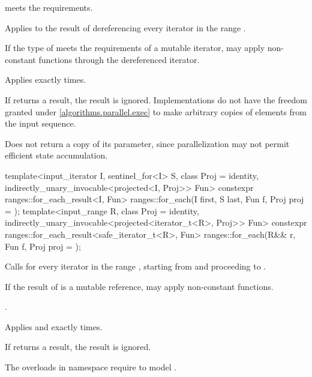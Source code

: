 \begin{itemdescr}
\pnum
\expects
{} meets the  requirements.

\pnum
\effects
Applies  to the result of dereferencing
every iterator in the range .
\begin{note}
If the type of  meets the requirements of a mutable iterator,
 may apply non-constant functions through the dereferenced iterator.
\end{note}

\pnum
\complexity
Applies  exactly  times.

\pnum
\remarks
If  returns a result, the result is ignored.
Implementations do not have
the freedom granted under \ref{algorithms.parallel.exec}
to make arbitrary copies of elements from the input sequence.

\pnum
\begin{note}
Does not return a copy of its  parameter,
since parallelization may not permit efficient state accumulation.
\end{note}
\end{itemdescr}

%
\begin{itemdecl}
template<input_iterator I, sentinel_for<I> S, class Proj = identity,
         indirectly_unary_invocable<projected<I, Proj>> Fun>
  constexpr ranges::for_each_result<I, Fun>
    ranges::for_each(I first, S last, Fun f, Proj proj = {});
template<input_range R, class Proj = identity,
         indirectly_unary_invocable<projected<iterator_t<R>, Proj>> Fun>
  constexpr ranges::for_each_result<safe_iterator_t<R>, Fun>
    ranges::for_each(R&& r, Fun f, Proj proj = {});
\end{itemdecl}

\begin{itemdescr}
\pnum
\effects
Calls 
for every iterator  in the range ,
starting from  and proceeding to .
\begin{note}
If the result of  is a mutable reference,
 may apply non-constant functions.
\end{note}

\pnum
\returns
{}.

\pnum
\complexity
Applies  and  exactly  times.

\pnum
\remarks
If  returns a result, the result is ignored.

\pnum
\begin{note}
The overloads in namespace  require
 to model .
\end{note}
\end{itemdescr}

